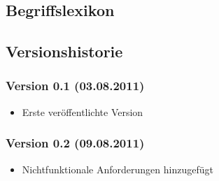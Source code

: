 \documentclass[a4paper,10pt,titlepage]{article}
\newcommand{\begriff}[7]
{\subsection{#1}
\begin{tabular}{|p{0.2\textwidth}|p{0.7\textwidth}|}
\hline
  Bedeutung & #2\\\hline
  Abgrenzung & #3\\\hline
  Gültigkeit & #4\\\hline
  Bezeichnung & #5\\\hline
  Unklarheiten & #6\\\hline
  Querverweise & #7\\\hline
 \end{tabular}}
\begin{document}
\subsection{Begriffslexikon}


\clearpage
\subsection{Versionshistorie}

	\subsubsection*{Version 0.1 (03.08.2011)}
	\begin{itemize}
		\item Erste veröffentlichte Version
	\end{itemize}

	\subsubsection*{Version 0.2 (09.08.2011)}
	\begin{itemize}
		\item Nichtfunktionale Anforderungen hinzugefügt
	\end{itemize}
\end{document}
